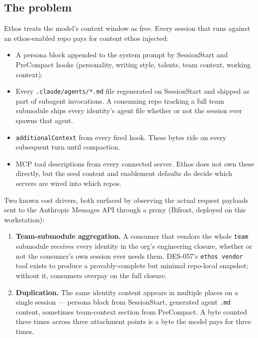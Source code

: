 \documentclass[a4paper,10pt]{article}
\newcommand{\field}[1]{\texttt{#1}}
\newcommand{\fpath}[1]{\texttt{#1}}
\begin{document}
\subsection*{The problem}

Ethos treats the model's context window as free.  Every session that
runs against an ethos-enabled repo pays for content ethos injected:

\begin{itemize}
  \item A persona block appended to the system prompt by SessionStart
    and PreCompact hooks (personality, writing style, talents, team
    context, working context).
  \item Every \fpath{.claude/agents/*.md} file regenerated on
    SessionStart and shipped as part of subagent invocations.  A
    consuming repo tracking a full team submodule ships every
    identity's agent file whether or not the session ever spawns
    that agent.
  \item \field{additionalContext} from every fired hook.  These bytes
    ride on every subsequent turn until compaction.
  \item MCP tool descriptions from every connected server.  Ethos does
    not own these directly, but the seed content and enablement
    defaults do decide which servers are wired into which repos.
\end{itemize}

Two known cost drivers, both surfaced by observing the actual
request payloads sent to the Anthropic Messages API through a proxy
(Bifrost, deployed on this workstation):

\begin{enumerate}
  \item \textbf{Team-submodule aggregation.}  A consumer that vendors
    the whole \texttt{team} submodule receives every identity in the
    org's engineering closure, whether or not the consumer's own
    session ever needs them.  DES-057's \texttt{ethos vendor} tool
    exists to produce a provably-complete but minimal repo-local
    snapshot; without it, consumers overpay on the full closure.

  \item \textbf{Duplication.}  The same identity content appears in
    multiple places on a single session --- persona block from
    SessionStart, generated agent \texttt{.md} content, sometimes
    team-context section from PreCompact.  A byte counted three times
    across three attachment points is a byte the model pays for three
    times.
\end{enumerate}
\end{document}
